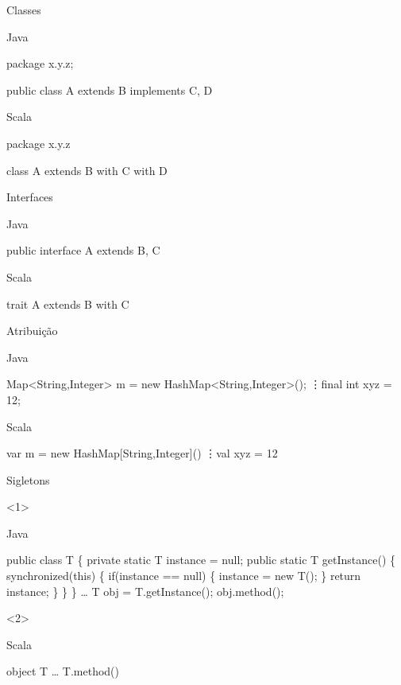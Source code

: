 \documentclass[12pt]{beamer}
\newenvironment{scala}{
\begin{block}{Scala} \begin{semiverbatim}
}{
\end{semiverbatim} \end{block}
}
\newenvironment{java}{
\protect\begin{block}{Java}
\protect\begin{semiverbatim}
}{
\protect\end{semiverbatim}
\protect\end{block}
}
\begin{document}
\begin{frame}[fragile]{Classes}

\begin{java}
package x.y.z;

public class A extends B implements C, D {
}
\end{java}
\pause
\begin{scala}
package x.y.z

class A extends B with C with D
\end{scala}

\end{frame}

\begin{frame}[fragile]{Interfaces}

\begin{java}
public interface A extends B, C {
}
\end{java}
\pause
\begin{scala}
trait A extends B with C 
\end{scala}

\end{frame}

\begin{frame}[fragile]{Atribuição}
\begin{java}
Map<String,Integer> m = 
   new HashMap<String,Integer>();
\vdots final int xyz = 12;
\end{java}
\pause
\begin{scala}
var m = new HashMap[String,Integer]()
\vdots val xyz = 12
\end{scala}
\end{frame}

\begin{frame}[fragile]{Sigletons}

\begin{onlyenv}<1>
\begin{java}
public class T \{
  private static T instance = null;
  public static T getInstance() \{
    synchronized(this) \{
      if(instance == null) \{
        instance = new T();
      \}
      return instance;
     \}
  \}
\}
\dots
T obj = T.getInstance();
obj.method();
\end{java}
\end{onlyenv}

\begin{onlyenv}<2>
\begin{scala}
object T
\dots
T.method()
\end{scala}
\end{onlyenv}

\end{frame}
\end{document}
